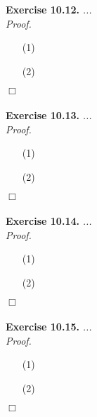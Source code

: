 \documentclass{article}
\begin{document}



\textbf{Exercise 10.12.}
\emph{...} \\

\emph{Proof.}
\begin{enumerate}
\item[(1)]
\item[(2)]

\end{enumerate}
$\Box$ \\\\






\textbf{Exercise 10.13.}
\emph{...} \\

\emph{Proof.}
\begin{enumerate}
\item[(1)]
\item[(2)]

\end{enumerate}
$\Box$ \\\\






\textbf{Exercise 10.14.}
\emph{...} \\

\emph{Proof.}
\begin{enumerate}
\item[(1)]
\item[(2)]

\end{enumerate}
$\Box$ \\\\






\textbf{Exercise 10.15.}
\emph{...} \\

\emph{Proof.}
\begin{enumerate}
\item[(1)]
\item[(2)]

\end{enumerate}
$\Box$ \\\\
\end{document}
